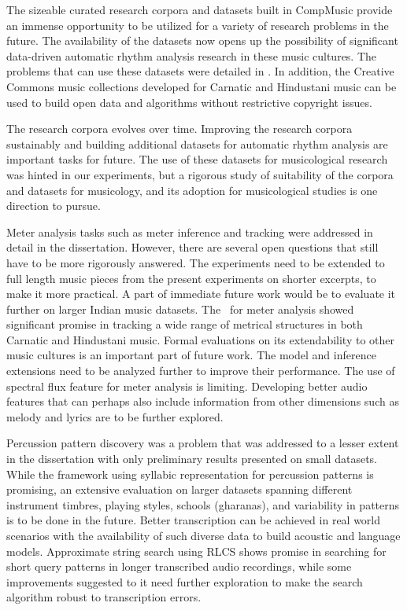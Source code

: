 The sizeable curated research corpora and datasets built in CompMusic provide an immense opportunity to be utilized for a variety of research problems in the future. The availability of the datasets now opens up the possibility of significant data-driven automatic rhythm analysis research in these music cultures. The problems that can use these datasets were detailed in . In addition, the Creative Commons music collections developed for Carnatic and Hindustani music can be used to build open data and algorithms without restrictive copyright issues. 

The research corpora evolves over time. Improving the research corpora sustainably and building additional datasets for automatic rhythm analysis are important tasks for future. The use of these datasets for musicological research was hinted in our experiments, but a rigorous study of suitability of the corpora and datasets for musicology, and its adoption for musicological studies is one direction to pursue. 

Meter analysis tasks such as meter inference and tracking were addressed in detail in the dissertation. However, there are several open questions that still have to be more rigorously answered. The experiments need to be extended to full length music pieces from the present experiments on shorter excerpts, to make it more practical. A part of immediate future work would be to evaluate it further on larger Indian music datasets. The \spmodel\ for meter analysis showed significant promise in tracking a wide range of metrical structures in both Carnatic and Hindustani music. Formal evaluations on its extendability to other music cultures is an important part of future work. The model and inference extensions need to be analyzed further to improve their performance. The use of spectral flux feature for meter analysis is limiting. Developing better audio features that can perhaps also include information from other dimensions such as melody and lyrics are to be further explored. 

Percussion pattern discovery was a problem that was addressed to a lesser extent in the dissertation with only preliminary results presented on small datasets. While the framework using syllabic representation for percussion patterns is promising, an extensive evaluation on larger datasets spanning different instrument timbres, playing styles, schools (\glspl{gharana}), and variability in patterns is to be done in the future. Better transcription can be achieved in real world scenarios with the availability of such diverse data to build acoustic and language models. Approximate string search using \gls{RLCS} shows promise in searching for short query patterns in longer transcribed audio recordings, while some improvements suggested to it need further exploration to make the search algorithm robust to transcription errors. 

